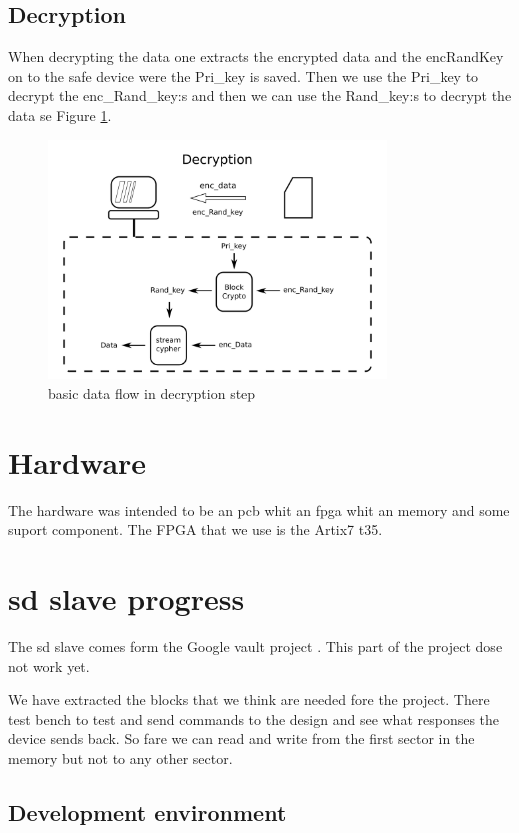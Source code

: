 \documentclass[]{article}
\begin{document}
\subsection{Decryption}
When decrypting the data one extracts the encrypted data and the \acrfull{encRandKey} on to the safe device were the Pri\_key is saved.
Then we use the Pri\_key to decrypt the enc\_Rand\_key:s and then we can use the Rand\_key:s to decrypt the data se Figure \ref{fig:decrypt}.

\begin{figure}[h]
	\centering
	\includegraphics[width=0.8\textwidth]{ilustrations/decryption.pdf}
	\caption{basic data flow in decryption step}
	\label{fig:decrypt}
\end{figure}



\section{Hardware}
The hardware was intended to be an \acrfull{pcb} whit an \acrfull{fpga} whit an memory and some suport component.
The FPGA that we use is the Artix7 t35.


\section{sd slave progress}
The sd slave comes form the Google vault project \cite{GV}.
This part of the project dose not work yet.

We have extracted the blocks that we think are needed fore the project.
There test bench to test and send commands to the design and see what responses the device sends back.
So fare we can read and write from the first sector in the memory but not to any other sector.

\subsection{Development environment}
\end{document}
